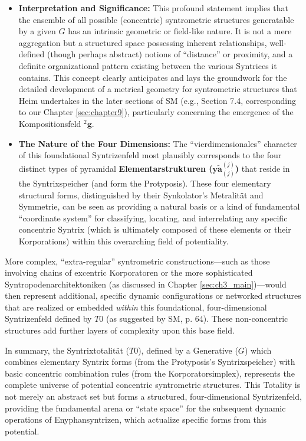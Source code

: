 \documentclass[
    12pt,              %
    a4paper,           %
    headings=normal,   %
    twoside=true,      %
    BCOR=8mm,          %
]{scrbook}
\newcommand{\q}[1]{\enquote{#1}}
\newcommand{\elementarstruktur}{\bm{y\widetilde{a}}_{(j)}}
\newcommand{\syntrixtotalitaet}{T0}
\newcommand{\generative}{G}
\newcommand{\kompositionsfeld}{{}^2\mathbf{g}}
\begin{document}
\begin{itemize}
    \item   \textbf{Interpretation and Significance:} This profound statement implies that the ensemble of all possible (concentric) syntrometric structures generatable by a given \(\generative\) has an intrinsic geometric or field-like nature. It is not a mere aggregation but a structured space possessing inherent relationships, well-defined (though perhaps abstract) notions of \q{distance} or proximity, and a definite organizational pattern existing between the various Syntrices it contains. This concept clearly anticipates and lays the groundwork for the detailed development of a metrical geometry for syntrometric structures that Heim undertakes in the later sections of SM (e.g., Section 7.4, corresponding to our Chapter \ref{sec:chapter9}), particularly concerning the emergence of the Kompositionsfeld \(\kompositionsfeld\).
    \item   \textbf{The Nature of the Four Dimensions:} The \q{vierdimensionales} character of this foundational Syntrizenfeld most plausibly corresponds to the four distinct types of pyramidal \textbf{Elementarstrukturen (\(\elementarstruktur^{(j)}\))} that reside in the Syntrixspeicher (and form the Protyposis). These four elementary structural forms, distinguished by their Synkolator's Metralität and Symmetrie, can be seen as providing a natural basis or a kind of fundamental \q{coordinate system} for classifying, locating, and interrelating any specific concentric Syntrix (which is ultimately composed of these elements or their Korporations) within this overarching field of potentiality.
\end{itemize}
More complex, \q{extra-regular} syntrometric constructions—such as those involving chains of excentric Korporatoren or the more sophisticated Syntropodenarchitektoniken (as discussed in Chapter \ref{sec:ch3_main})—would then represent additional, specific dynamic configurations or networked structures that are realized or embedded \textit{within} this foundational, four-dimensional Syntrizenfeld defined by \(\syntrixtotalitaet\) (as suggested by SM, p. 64). These non-concentric structures add further layers of complexity upon this base field.

In summary, the Syntrixtotalität (\(\syntrixtotalitaet\)), defined by a Generative (\(\generative\)) which combines elementary Syntrix forms (from the Protyposis's Syntrixspeicher) with basic concentric combination rules (from the Korporatorsimplex), represents the complete universe of potential concentric syntrometric structures. This Totality is not merely an abstract set but forms a structured, four-dimensional Syntrizenfeld, providing the fundamental arena or \q{state space} for the subsequent dynamic operations of Enyphansyntrizen, which actualize specific forms from this potential.
\end{document}
